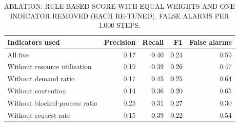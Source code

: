 \begin{table}[t]
\centering
\footnotesize
\caption{ABLATION: RULE-BASED SCORE WITH EQUAL WEIGHTS AND ONE INDICATOR REMOVED (EACH RE-TUNED). FALSE ALARMS PER 1,000 STEPS.}
\label{tab:ablation}
\setlength{\tabcolsep}{4pt}\begin{tabular}{lrrrr}
\toprule
Indicators used & Precision & Recall & F1 & False alarms \\
\midrule
All five & 0.17 & 0.40 & 0.24 & 0.59 \\
Without resource utilisation & 0.19 & 0.39 & 0.26 & 0.47 \\
Without demand ratio & 0.17 & 0.45 & 0.25 & 0.64 \\
Without contention & 0.14 & 0.36 & 0.20 & 0.65 \\
Without blocked-process ratio & 0.23 & 0.31 & 0.27 & 0.30 \\
Without request rate & 0.15 & 0.39 & 0.22 & 0.54 \\
\bottomrule
\end{tabular}
\end{table}
